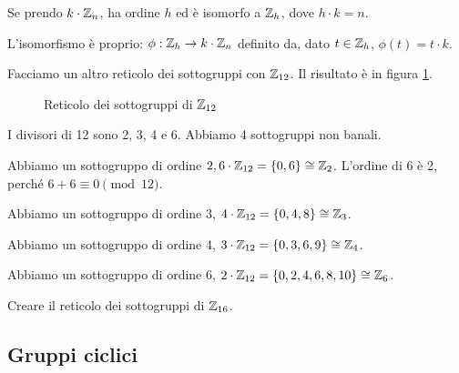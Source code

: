 \begin{exmp}
\begin{oss}
Se prendo $k \cdot \mathbb{Z}_n$, ha ordine $h$ ed \`e isomorfo a $\mathbb{Z}_h$, dove $h \cdot k = n$.

L'isomorfismo \`e proprio: $\phi : \mathbb{Z}_h \to k \cdot \mathbb{Z}_n$ definito da, dato $t \in \mathbb{Z}_h$, $\phi(t) = t \cdot k$.
\end{oss}

Facciamo un altro reticolo dei sottogruppi con $\mathbb{Z}_{12}$. Il risultato \`e in figura \ref{fig:reticolo_sottogruppi_z12}.

\begin{figure}
\centering
{}
\caption{Reticolo dei sottogruppi di $\mathbb{Z}_{12}$\label{fig:reticolo_sottogruppi_z12}}
\end{figure}

I divisori di 12 sono 2, 3, 4 e 6. Abbiamo 4 sottogruppi non banali.

Abbiamo un sottogruppo di ordine $2, 6 \cdot \mathbb{Z}_{12} = \{ 0, 6 \} \cong \mathbb{Z}_2$. L'ordine di 6 \`e 2, perch\'e $6 + 6 \equiv 0 \pmod{12}$.

Abbiamo un sottogruppo di ordine 3, $4 \cdot \mathbb{Z}_{12} = \{ 0, 4, 8 \} \cong \mathbb{Z}_3$.

Abbiamo un sottogruppo di ordine 4, $3 \cdot \mathbb{Z}_{12} = \{ 0, 3, 6, 9 \} \cong \mathbb{Z}_4$.

Abbiamo un sottogruppo di ordine 6, $2 \cdot \mathbb{Z}_{12} = \{ 0, 2, 4, 6, 8, 10 \} \cong \mathbb{Z}_6$.
\end{exmp}

\begin{esercizio}
Creare il reticolo dei sottogruppi di $\mathbb{Z}_{16}$.
\end{esercizio}

\subsection{Gruppi ciclici}

